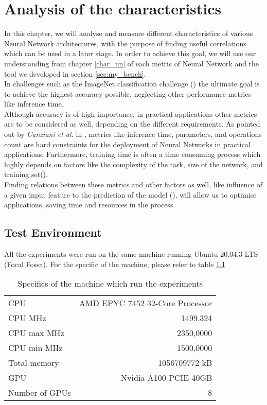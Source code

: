 \chapter{Analysis of the characteristics}\label{ana_char}
In this chapter, we will analyse and measure different characteristics of various Neural Network architectures, with the purpose of finding useful correlations which can be used in a later stage. In order to achieve this goal, we will use our understanding from chapter \ref{char_nn} of each metric of Neural Network and the tool we developed in section \ref{sec:my_bench}. \\
In challenges such as the ImageNet classification challenge (\cite{ILSVRC15}) the ultimate goal is to achieve the highest accuracy possible, neglecting other performance metrics like inference time. \cite{DBLP:journals/corr/CanzianiPC16}\\
Although accuracy is of high importance, in practical applications other metrics are to be considered as well, depending on the different requirements. As pointed out by \textit{Canziani et al.} in \cite{DBLP:journals/corr/CanzianiPC16}, metrics like inference time, parameters, and operations count are hard constraints
for the deployment of Neural Networks in practical applications. Furthermore, training time is often a time consuming process which highly depends on factors like the complexity of the task, size of the network, and training set(\cite{118273}). \\
Finding relations between these metrics and other factors as well, like influence of a given input feature to the prediction of the model (\cite{hooker2019benchmark}), will allow us to optimise applications, saving time and resources in the process.
\section{Test Environment}
All the experiments were run on the same machine running Ubuntu 20.04.3 LTS (Focal Fossa). For the specific of the machine, please refer to table \ref{tab:gpu_info}
\begin{table}[h]
\centering
\begin{tabular}{|l  |r|}
 \hline
CPU & AMD EPYC 7452 32-Core Processor\\
CPU MHz&                     1499.324\\
CPU max MHz&                     2350,0000\\
CPU min MHz&                     1500,0000\\
Total memory&       1056709772 kB\\
GPU&    Nvidia A100-PCIE-40GB\\
Number of GPUs & 8\\
\hline
\end{tabular}
\caption{Specifics of the machine which run the experiments}
\label{tab:gpu_info}
\end{table}

